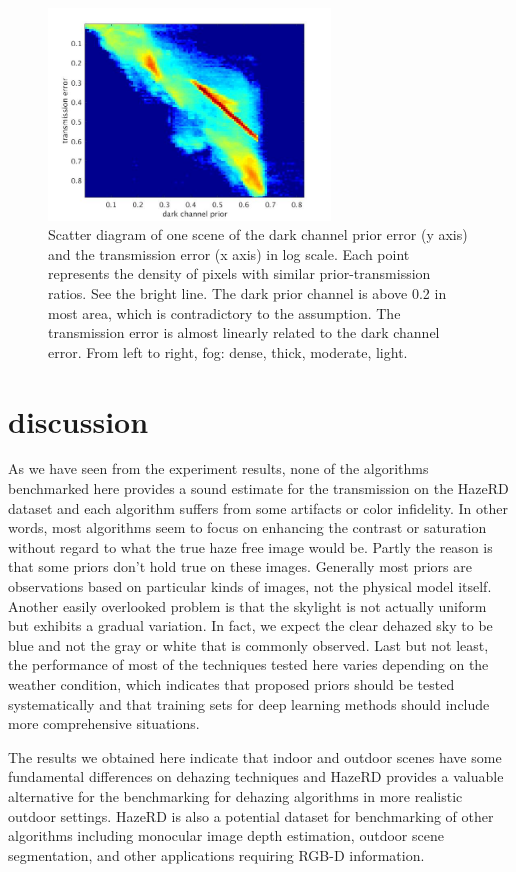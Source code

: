 \begin{figure}[ht]
\hfill
\begin{minipage}[b]{0.45\linewidth}
  \centering
  \centerline{\includegraphics[width=7.5cm]{hazerd/scatterhist/1000}}
\end{minipage}
\caption{Scatter diagram of one scene of the dark channel prior error (y axis) and the transmission error (x axis) in log scale. Each point represents the density of pixels with similar prior-transmission ratios. See the bright line. The dark prior channel is above 0.2 in most area, which is contradictory to the assumption. The transmission error is almost linearly related to the dark channel error. From left to right, fog: dense, thick, moderate, light.}
\label{fig:3.scatterhist}
\end{figure}
\section{discussion}
\label{sec:3.6.discussion}
As we have seen from the experiment results, none of the algorithms benchmarked here provides a sound estimate for the transmission on the HazeRD dataset and each algorithm suffers from some artifacts or color infidelity. In other words, most algorithms seem to focus on enhancing the contrast or saturation without regard to what the true haze free image would be. Partly the reason is that some priors don't hold true on these images. Generally most priors are observations based on particular kinds of images, not the physical model itself. Another easily overlooked problem is that the skylight is not actually uniform but exhibits a gradual variation. In fact, we expect the clear dehazed sky to be blue and not the gray or white that is commonly observed. Last but not least, the performance of most of the techniques tested here varies depending on the weather condition, which indicates that proposed priors should be tested systematically and that training sets for deep learning methods should include more comprehensive situations.

The results we obtained here indicate that indoor and outdoor scenes have some fundamental differences on dehazing techniques and  HazeRD provides a valuable alternative for the benchmarking for dehazing algorithms in more realistic outdoor settings. HazeRD is also a potential dataset for benchmarking of other algorithms including monocular image depth estimation, outdoor scene segmentation, and other applications requiring RGB-D information.